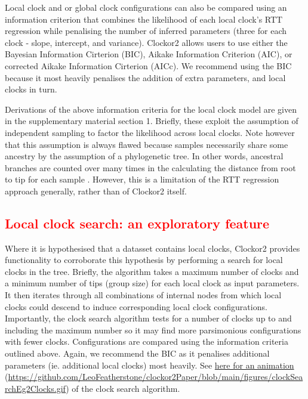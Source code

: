 \documentclass{article}
\begin{document}
Local clock and or global clock configurations can also be compared using an information criterion that combines the likelihood of each local clock's RTT regression while penalising the number of inferred parameters (three for each clock - slope, intercept, and variance). Clockor2 allows users to use either the Bayesian Information Cirterion (BIC), Aikake Information Criterion (AIC), or corrected Aikake Information Cirterion (AICc). We recommend using the BIC because it most heavily penalises the addition of extra parameters, and local clocks in turn.

Derivations of the above information criteria for the local clock model are given in the supplementary material section 1. Briefly, these exploit the assumption of independent sampling to factor the likelihood across local clocks. Note however that this assumption is always flawed because samples necessarily share some ancestry by the assumption of a phylogenetic tree. In other words, ancestral branches are counted over many times in the calculating the distance from root to tip for each sample \citep{duchene_2016_estimating}. However, this is a limitation of the RTT regression approach generally, rather than of Clockor2 itself.

\subsection*{\textcolor{red}{Local clock search: an exploratory feature}}
Where it is hypothesised that a datasset contains local clocks, Clockor2 provides functionality to corroborate this hypothesis by performing a search for local clocks in the tree. Briefly, the algorithm takes a maximum number of clocks and a minimum number of tips (group size) for each local clock as input parameters. It then iterates through all combinations of internal nodes from which local clocks could descend to induce corresponding local clock configurations. Importantly, the clock search algorithm tests for a number of clocks up to and including the maximum number so it may find more parsimonious configurations with fewer clocks. Configurations are compared using the information criteria outlined above. Again, we recommend the BIC as it penalises additional parameters (ie. additional local clocks) most heavily. See \href{https://github.com/LeoFeatherstone/clockor2Paper/blob/main/figures/clockSearchEg2Clocks.gif}{here for an animation} (\url{https://github.com/LeoFeatherstone/clockor2Paper/blob/main/figures/clockSearchEg2Clocks.gif}) of the clock search algorithm. 
\end{document}
